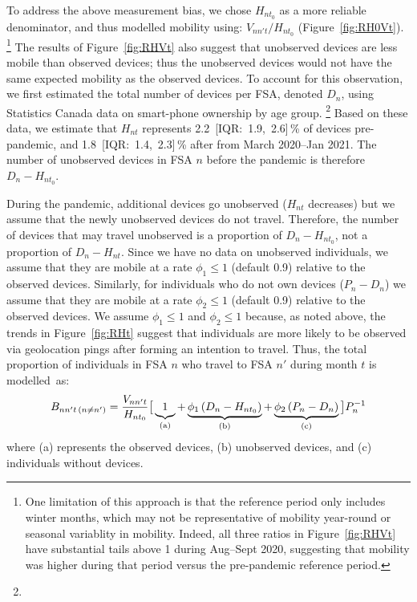 \par
To address the above measurement bias, we chose $H_{nt_0}$ as a more reliable denominator,
and thus modelled mobility using: $V_{nn't} / H_{nt_0}$ (Figure~\ref{fig:RH0Vt}).%
\footnote{One limitation of this approach is that the reference period only includes winter months,
  which may not be representative of mobility year-round or seasonal variablity in mobility.
  Indeed, all three ratios in Figure~\ref{fig:RHVt} have substantial tails above 1 during Aug--Sept 2020,
  suggesting that mobility was higher during that period versus the pre-pandemic reference period.}
The results of Figure~\ref{fig:RHVt} also suggest that
unobserved devices are less mobile than observed devices;
thus the unobserved devices would not have the same expected mobility as the observed devices.
To account for this observation, we first estimated the total number of devices per FSA, denoted $D_n$,
using Statistics Canada data on smart-phone ownership by age group.%
\footnote{}
Based on these data, we estimate that $H_{nt}$ represents
2.2~[IQR:~1.9,~2.6]\,\% of devices pre-pandemic, and
1.8~[IQR:~1.4,~2.3]\,\% after from March 2020--Jan 2021.
The number of unobserved devices in FSA $n$ before the pandemic is therefore $D_n - H_{nt_0}$.
\par
During the pandemic, additional devices go unobserved ($H_{nt}$ decreases)
but we assume that the newly unobserved devices do not travel.
Therefore, the number of devices that may travel unobserved
is a proportion of $D_n - H_{nt_0}$, not a proportion of $D_n - H_{nt}$.
Since we have no data on unobserved individuals, we assume that they are mobile
at a rate $\phi_1 \le 1$ (default 0.9) relative to the observed devices.
Similarly, for individuals who do not own devices ($P_n - D_n$) we assume that they are mobile
at a rate $\phi_2 \le 1$ (default 0.9) relative to the observed devices.
We assume $\phi_1 \le 1$ and $\phi_2 \le 1$ because, as noted above,
the trends in Figure~\ref{fig:RHt} suggest that
individuals are more likely to be observed via geolocation pings after forming an intention to travel.
Thus, the total proportion of individuals in FSA $n$ who travel to FSA $n'$ during month $t$ is modelled~as:
\begin{equation}\label{eq:Bnnt.inter}
  B_{nn't \,(n\ne n')} = \frac{V_{nn't}}{H_{nt_0}} \big[
  \underbrace{1\vphantom{\phi}}_{\textrm{(a)}}
  + \underbrace{\phi_1 \left(D_n - H_{nt_0}\right)}_{\textrm{(b)}}
  + \underbrace{\phi_2 \left(P_n - D_n\right)}_{\textrm{(c)}} \big] P_n^{-1}
\end{equation}
where (a) represents the observed devices,
(b) unobserved devices, and
(c) individuals without devices.
